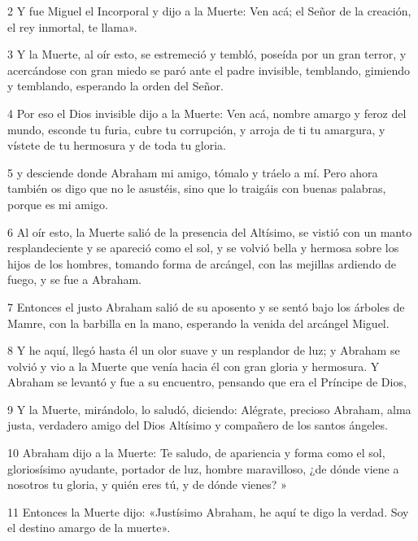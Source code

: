 \par 2 Y fue Miguel el Incorporal y dijo a la Muerte: Ven acá; el Señor de la creación, el rey inmortal, te llama».

\par 3 Y la Muerte, al oír esto, se estremeció y tembló, poseída por un gran terror, y acercándose con gran miedo se paró ante el padre invisible, temblando, gimiendo y temblando, esperando la orden del Señor.

\par 4 Por eso el Dios invisible dijo a la Muerte: Ven acá, nombre amargo y feroz del mundo, esconde tu furia, cubre tu corrupción, y arroja de ti tu amargura, y vístete de tu hermosura y de toda tu gloria.

\par 5 y desciende donde Abraham mi amigo, tómalo y tráelo a mí. Pero ahora también os digo que no le asustéis, sino que lo traigáis con buenas palabras, porque es mi amigo.

\par 6 Al oír esto, la Muerte salió de la presencia del Altísimo, se vistió con un manto resplandeciente y se apareció como el sol, y se volvió bella y hermosa sobre los hijos de los hombres, tomando forma de arcángel, con las mejillas ardiendo de fuego, y se fue a Abraham.

\par 7 Entonces el justo Abraham salió de su aposento y se sentó bajo los árboles de Mamre, con la barbilla en la mano, esperando la venida del arcángel Miguel.

\par 8 Y he aquí, llegó hasta él un olor suave y un resplandor de luz; y Abraham se volvió y vio a la Muerte que venía hacia él con gran gloria y hermosura. Y Abraham se levantó y fue a su encuentro, pensando que era el Príncipe de Dios,

\par 9 Y la Muerte, mirándolo, lo saludó, diciendo: Alégrate, precioso Abraham, alma justa, verdadero amigo del Dios Altísimo y compañero de los santos ángeles.

\par 10 Abraham dijo a la Muerte: Te saludo, de apariencia y forma como el sol, gloriosísimo ayudante, portador de luz, hombre maravilloso, ¿de dónde viene a nosotros tu gloria, y quién eres tú, y de dónde vienes? »

\par 11 Entonces la Muerte dijo: «Justísimo Abraham, he aquí te digo la verdad. Soy el destino amargo de la muerte».

